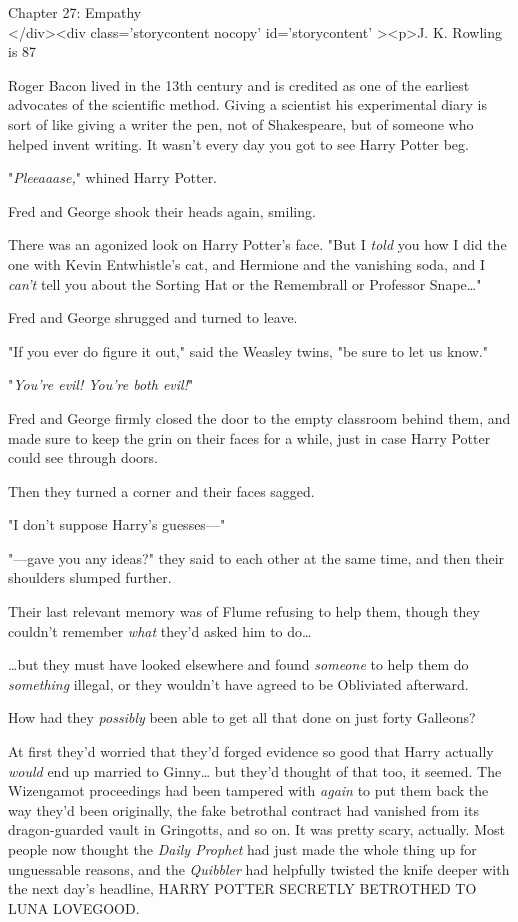 
Chapter 27: Empathy\\
</div><div  class='storycontent nocopy' id='storycontent' ><p>J. K. Rowling is 
87%

Roger Bacon lived in the 13th century and is credited as one of the earliest 
advocates of the scientific method. Giving a scientist his experimental diary 
is sort of like giving a writer the pen, not of Shakespeare, but of someone who 
helped invent writing.
\sbreak
It wasn't every day you got to see Harry Potter beg.

"\emph{Pleeaaase,}" whined Harry Potter.

Fred and George shook their heads again, smiling.

There was an agonized look on Harry Potter's face. "But I \emph{told} you how I 
did the one with Kevin Entwhistle's cat, and Hermione and the vanishing soda, 
and I \emph{can't} tell you about the Sorting Hat or the Remembrall or 
Professor Snape{\ldots}"

Fred and George shrugged and turned to leave.

"If you ever do figure it out," said the Weasley twins, "be sure to let us 
know."

"\emph{You're evil! You're both evil!}"

Fred and George firmly closed the door to the empty classroom behind them, and 
made sure to keep the grin on their faces for a while, just in case Harry 
Potter could see through doors.

Then they turned a corner and their faces sagged.

"I don't suppose Harry's guesses---"

"---gave you any ideas?" they said to each other at the same time, and then 
their shoulders slumped further.

Their last relevant memory was of Flume refusing to help them, though they 
couldn't remember \emph{what} they'd asked him to do{\ldots}

{\ldots}but they must have looked elsewhere and found \emph{someone} to help 
them do \emph{something} illegal, or they wouldn't have agreed to be Obliviated 
afterward.

How had they \emph{possibly} been able to get all that done on just forty 
Galleons?

At first they'd worried that they'd forged evidence so good that Harry actually 
\emph{would} end up married to Ginny{\ldots} but they'd thought of that too, it 
seemed. The Wizengamot proceedings had been tampered with \emph{again} to put 
them back the way they'd been originally, the fake betrothal contract had 
vanished from its dragon-guarded vault in Gringotts, and so on. It was pretty 
scary, actually. Most people now thought the \emph{Daily Prophet} had just made 
the whole thing up for unguessable reasons, and the \emph{Quibbler} had 
helpfully twisted the knife deeper with the next day's headline, HARRY POTTER 
SECRETLY BETROTHED TO LUNA LOVEGOOD.

